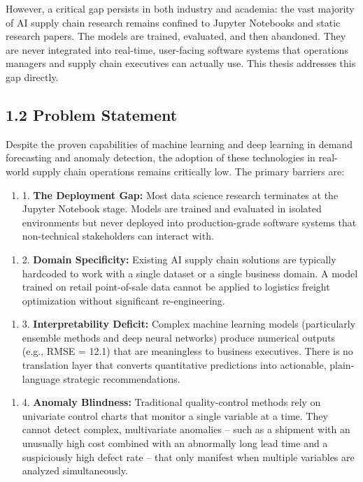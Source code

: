 \documentclass[12pt, a4paper]{report}
\begin{document}
However, a critical gap persists in both industry and academia: the vast majority of AI supply chain research remains confined to Jupyter Notebooks and static research papers. The models are trained, evaluated, and then abandoned. They are never integrated into real-time, user-facing software systems that operations managers and supply chain executives can actually use. This thesis addresses this gap directly.

\subsection{1.2 Problem Statement}

Despite the proven capabilities of machine learning and deep learning in demand forecasting and anomaly detection, the adoption of these technologies in real-world supply chain operations remains critically low. The primary barriers are:

\begin{enumerate}
\item 1. \textbf{The Deployment Gap:} Most data science research terminates at the Jupyter Notebook stage. Models are trained and evaluated in isolated environments but never deployed into production-grade software systems that non-technical stakeholders can interact with.
\end{enumerate}

\begin{enumerate}
\item 2. \textbf{Domain Specificity:} Existing AI supply chain solutions are typically hardcoded to work with a single dataset or a single business domain. A model trained on retail point-of-sale data cannot be applied to logistics freight optimization without significant re-engineering.
\end{enumerate}

\begin{enumerate}
\item 3. \textbf{Interpretability Deficit:} Complex machine learning models (particularly ensemble methods and deep neural networks) produce numerical outputs (e.g., RMSE = 12.1) that are meaningless to business executives. There is no translation layer that converts quantitative predictions into actionable, plain-language strategic recommendations.
\end{enumerate}

\begin{enumerate}
\item 4. \textbf{Anomaly Blindness:} Traditional quality-control methods rely on univariate control charts that monitor a single variable at a time. They cannot detect complex, multivariate anomalies -- such as a shipment with an unusually high cost combined with an abnormally long lead time and a suspiciously high defect rate -- that only manifest when multiple variables are analyzed simultaneously.
\end{enumerate}
\end{document}
